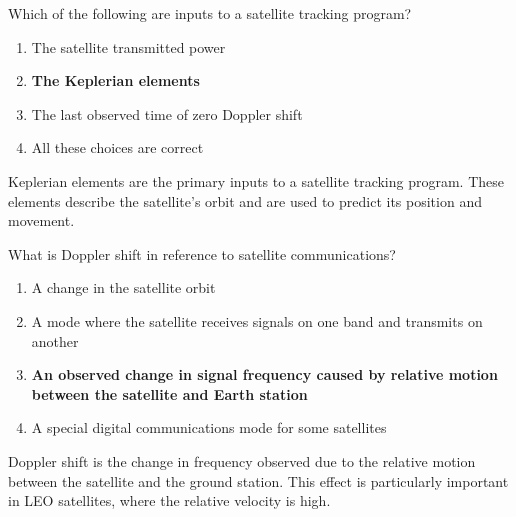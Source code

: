 
\begin{tcolorbox}[colback=gray!10!white,colframe=black!75!black,title={T8B06}]
    Which of the following are inputs to a satellite tracking program?
    \begin{enumerate}[label=\Alph*),noitemsep]
        \item The satellite transmitted power
        \item \textbf{The Keplerian elements}
        \item The last observed time of zero Doppler shift
        \item All these choices are correct
    \end{enumerate}
\end{tcolorbox}
Keplerian elements are the primary inputs to a satellite tracking program. These elements describe the satellite's orbit and are used to predict its position and movement.


\begin{tcolorbox}[colback=gray!10!white,colframe=black!75!black,title={T8B07}]
    What is Doppler shift in reference to satellite communications?
    \begin{enumerate}[label=\Alph*),noitemsep]
        \item A change in the satellite orbit
        \item A mode where the satellite receives signals on one band and transmits on another
        \item \textbf{An observed change in signal frequency caused by relative motion between the satellite and Earth station}
        \item A special digital communications mode for some satellites
    \end{enumerate}
\end{tcolorbox}
Doppler shift is the change in frequency observed due to the relative motion between the satellite and the ground station. This effect is particularly important in LEO satellites, where the relative velocity is high.


